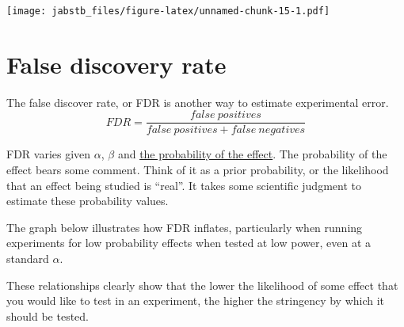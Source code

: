 \documentclass[]{book}
\begin{document}
\texttt{[image: jabstb\_files/figure-latex/unnamed-chunk-15-1.pdf]}

\hypertarget{false-discovery-rate}{%
\section{False discovery rate}\label{false-discovery-rate}}

The false discover rate, or FDR is another way to estimate experimental error.
\[FDR=\frac{false\ positives}{false\ positives + false\ negatives}\]

FDR varies given \(\alpha\), \(\beta\) and \href{http://rsos.royalsocietypublishing.org/content/1/3/140216}{the probability of the effect}. The probability of the effect bears some comment. Think of it as a prior probability, or the likelihood that an effect being studied is ``real''. It takes some scientific judgment to estimate these probability values.

The graph below illustrates how FDR inflates, particularly when running experiments for low probability effects when tested at low power, even at a standard \(\alpha\).

These relationships clearly show that the lower the likelihood of some effect that you would like to test in an experiment, the higher the stringency by which it should be tested.
\end{document}
